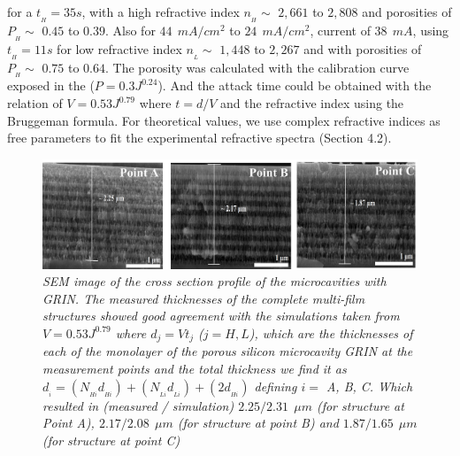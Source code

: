 \documentclass{article}
\begin{document}
for a $t_{_{H}}=35 s $, with a high refractive index $n_{_{H}} \sim$ $
2,661$ to $ 2,808$ and porosities of $P_{_{H}} \sim$ $ 0.45 $ to $
0.39 $. Also for $ 44 \ \ mA /cm^2 $ to $ 24 \ \ mA / cm^2 $, current
of $ 38 \ \ mA $, using $t_{_{H}}=11 s$  for low refractive index
$n_{_{L}}\sim$ $ 1,448 $ to $ 2,267 $ and with porosities of
$P_{_{H}} \sim$ $0.75 $ to $ 0.64 $. The porosity was calculated with
the calibration curve exposed in the ($ P = 0.3J^{0.24} $). And the
attack time could be obtained with the relation of $ V = 0.53J^{0.79}
$ where $ t = d / V $ and the refractive index using the Bruggeman
formula. For theoretical values, we use complex refractive indices as
free parameters to fit the experimental refractive spectra (Section
4.2).
 \begin{figure}
   \centering
   \includegraphics[scale=.5]{Images/MCGRINSEM}
   \caption{\emph{SEM image of the cross section profile of the
       microcavities with GRIN. The measured thicknesses of the
       complete multi-film structures showed good agreement with the
       simulations taken from $ V = 0.53J ^ {0.79} $ where $d_j=Vt_j$
       ($j=H,L$), which are the thicknesses of each of the monolayer
       of the porous silicon microcavity GRIN at the measurement
       points and the total thickness we find it as $d_{_{i}} =
       (N_{_{Hi}}d_{_{Hi}})+(N_{_{Li}}d_{_{Li}}) + (2d_{_{Hi}})$
       defining $ i = $ A, B, C. Which resulted in (measured /
       simulation) $ 2.25 / 2.31 \ \ \mu m $ (for structure at Point
       A), $ 2.17 / 2.08 \ \ \mu m $ (for structure at point B) and $
       1.87 / 1.65 \ \ \mu m $ (for structure at point C)}}
	\label{fig:MCGRIN4}
\end{figure}
\end{document}

